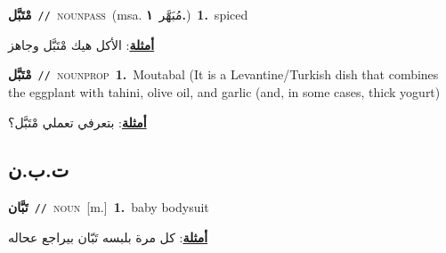 \documentclass[10pt,a4paper,twoside]{article} %
\begin{document}
\begin{multicols}{2}
{\setlength\topsep{0pt}\textbf{\foreignlanguage{arabic}{مْتَبَّل}}\ {\color{gray}\texttt{//}\color{black}}\ \textsc{noun\textunderscore pass}\ \color{gray}(msa. \foreignlanguage{arabic}{مُبَهَّر}~\foreignlanguage{arabic}{\textbf{١.}})\color{black}\ \textbf{1.}~spiced\  \begin{flushright}\color{gray}\foreignlanguage{arabic}{\textbf{\underline{\foreignlanguage{arabic}{أمثلة}}}: الأكل هيك مْتَبَّل وجاهز}\end{flushright}\color{black}} \vspace{2mm}

{\setlength\topsep{0pt}\textbf{\foreignlanguage{arabic}{مْتَبَّل}}\ {\color{gray}\texttt{//}\color{black}}\ \textsc{noun\textunderscore prop}\ \textbf{1.}~Moutabal (It is a Levantine/Turkish dish that combines the eggplant with tahini, olive oil, and garlic (and, in some cases, thick yogurt)\  \begin{flushright}\color{gray}\foreignlanguage{arabic}{\textbf{\underline{\foreignlanguage{arabic}{أمثلة}}}: بتعرفي تعملي مْتَبَّل؟}\end{flushright}\color{black}} \vspace{2mm}

\vspace{-3mm}
\subsection*{\color{blue}\foreignlanguage{arabic}{ت.ب.ن}\color{blue}{}} 

{\setlength\topsep{0pt}\textbf{\foreignlanguage{arabic}{تَبَّان}}\ {\color{gray}\texttt{//}\color{black}}\ \textsc{noun}\ [m.]\ \textbf{1.}~baby bodysuit\  \begin{flushright}\color{gray}\foreignlanguage{arabic}{\textbf{\underline{\foreignlanguage{arabic}{أمثلة}}}: كل مرة بلبسه تَبّان بيراجع عحاله}\end{flushright}\color{black}} \vspace{2mm}


\end{multicols}
\end{document}
